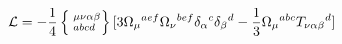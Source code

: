 \begin{equation}
{\cal L} = - \frac{1}{4} \left\{
\phantom{|}^{\mu\nu\alpha\beta}_{abcd}
\right\} [ 3 \Omega_\mu{}^{aef} \Omega_\nu{}^{bef} \delta_\alpha{}^c
\delta_\beta{}^d - \frac{1}{3} \Omega_\mu{}^{abc}
T_{\nu\alpha\beta}{}^d ]
\end{equation}

